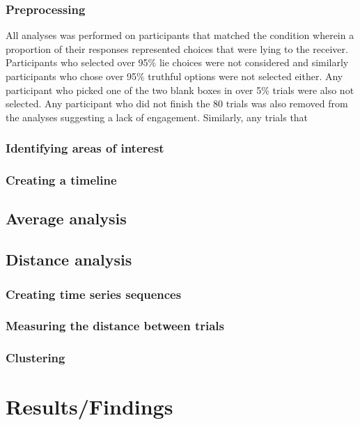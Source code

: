 \documentclass[man, floatsintext]{apa7}
\begin{document}
\subsubsection{Preprocessing}

All analyses was performed on participants that matched the condition wherein a proportion of their responses represented choices that were lying to the receiver. Participants who selected over 95\% lie choices were not considered and similarly participants who chose over 95\% truthful options were not selected either. Any participant who picked one of the two blank boxes in over 5\% trials were also not selected. Any participant who did not finish the 80 trials was also removed from the analyses suggesting a lack of engagement. Similarly, any trials that 

\subsubsection{Identifying areas of interest}

\subsubsection{Creating a timeline}

\subsection{Average analysis}

\subsection{Distance analysis}

\subsubsection{Creating time series sequences}

\subsubsection{Measuring the distance between trials}

\subsubsection{Clustering}


\section{Results/Findings}
\end{document}
